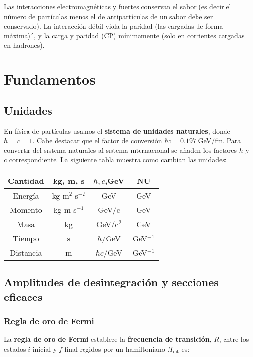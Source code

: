 Las interacciones electromagnéticas y fuertes conservan el sabor (es decir el número de partículas menos el de antipartículas de un sabor debe ser conservado). La interacción débil viola la paridad (las cargadas de forma máxima)´, y la carga y paridad (CP) mínimamente (solo en corrientes cargadas en hadrones).



\section{Fundamentos}

\subsection{Unidades}

En física de partículas usamos el \textbf{sistema de unidades naturales}, donde $\hbar=c=1$. Cabe destacar que el factor de conversión $\hbar c=0.197$ GeV/fm. Para convertir del sistema naturales al sistema internacional se añaden los factores $\hbar$ y $c$ correspondiente. La siguiente tabla muestra como cambian las unidades:

\begin{table}[h!] \centering
	\begin{tabular}{c|ccc} 
		Cantidad & kg, m, s & $\hbar,c$,GeV & NU \\ \hline
		Energía & kg m$^2$ s$^{-2}$ &  GeV & GeV \\
		Momento & kg m s$^{-1}$ & GeV/c & GeV \\
		Masa & kg &  GeV/c$^2$ & GeV \\
		Tiempo & s & $\hbar$/GeV & GeV$^{-1}$\\
		Distancia & m & $\hbar c$/GeV & GeV$^{-1}$ \\
	\end{tabular}
\end{table}

\subsection{Amplitudes de desintegración y secciones eficaces}

\subsubsection{Regla de oro de Fermi}

La \textbf{regla de oro de Fermi} establece la \textbf{frecuencia de transición}, $R$, entre los estados $i$-inicial y $f$-final regidos por un hamiltoniano $H_{\text{int}}$ es:

